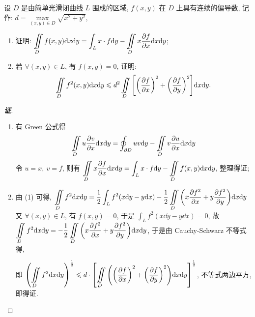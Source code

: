 \begin{example}[2023 西北大学]
    设 $D$ 是由简单光滑闭曲线 $L$ 围成的区域, $f(x,y)$ 在 $D$ 上具有连续的偏导数, 记作: $d=\max\limits_{(x,y)\in D}\sqrt{x^2+y^2}$, 
    \begin{enumerate}[label=(\arabic{*})]
        \item 证明: $\displaystyle \iint\limits_D f(x,y)\dd x\dd y=\int_L x\cdot f \dd y-\iint\limits_Dx\pdv{f}{x}\dd x\dd y$;
        \item 若 $\forall (x,y)\in L$, 有 $f(x,y)=0$, 证明:
              $$\iint\limits_D f^2(x,y)\dd x\dd y\leqslant d^2\iint\limits_D\qty[\qty(\pdv{f}{x})^2+\qty(\pdv{f}{y})^2]\dd x\dd y.$$
    \end{enumerate}
\end{example}
\begin{proof}[{\songti \textbf{证}}]
    \begin{enumerate}[label=(\arabic{*})]
        \item 有 Green 公式得 $$\iint\limits_Du\pdv{v}{x}\dd x\dd y=\oint_{\partial D}uv\dd y-\iint\limits_Dv\pdv{u}{x}\dd x\dd y$$
              令 $u=x,~v=f$, 则有 $\displaystyle\iint\limits_Dx\pdv{f}{x}\dd x\dd y=\int_Lx\cdot f\dd y-\iint\limits_Df(x,y)\dd x\dd y$, 整理得证;
        \item 由 (1) 可得, $\displaystyle \iint\limits_D f^2\dd x\dd y=\dfrac{1}{2}\int_L f^2(x\dd y-y\dd x)-\dfrac{1}{2}\iint\limits_D\qty(x\pdv{f^2}{x}+y\pdv{f^2}{y})\dd x\dd y$
              又 $\forall (x,y)\in L$, 有 $f(x,y)=0$, 于是 $\displaystyle \int_Lf^2(x\dd y-y\dd x)=0$, 故 $\displaystyle \iint\limits_D f^2\dd x\dd y=-\dfrac{1}{2}\iint\limits_D\qty(x\pdv{f^2}{x}+y\pdv{f^2}{y})\dd x\dd y$, 
              于是由 Cauchy-Schwarz 不等式得, 
              即 $\displaystyle \qty(\iint\limits_Df^2\dd x\dd y)^{\frac{1}{2}}\leqslant d\cdot\qty[\iint\limits_D \qty(\qty(\pdv{f}{x})^2+\qty(\pdv{f}{y})^2)\dd x\dd y]^{\frac{1}{2}}$, 不等式两边平方, 即得证.
    \end{enumerate}
\end{proof}

